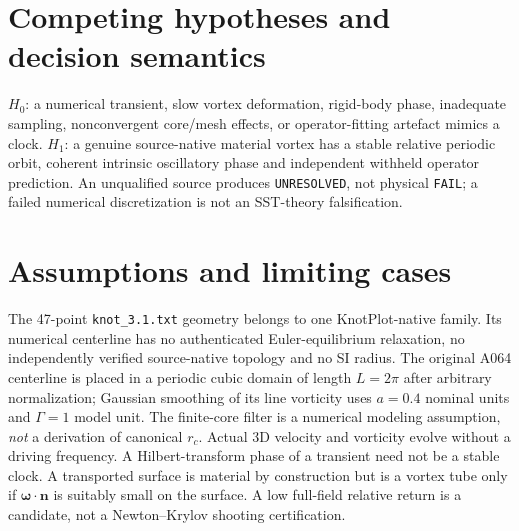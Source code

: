 \documentclass[11pt,a4paper]{article}
\begin{document}
\section{Competing hypotheses and decision semantics}
$H_0$: a numerical transient, slow vortex deformation, rigid-body phase, inadequate sampling, nonconvergent core/mesh effects, or operator-fitting artefact mimics a clock. $H_1$: a genuine source-native material vortex has a stable relative periodic orbit, coherent intrinsic oscillatory phase and independent withheld operator prediction. An unqualified source produces \texttt{UNRESOLVED}, not physical \texttt{FAIL}; a failed numerical discretization is not an SST-theory falsification.

\section{Assumptions and limiting cases}
The 47-point \texttt{knot\_3.1.txt} geometry belongs to one KnotPlot-native family. Its numerical centerline has no authenticated Euler-equilibrium relaxation, no independently verified source-native topology and no SI radius. The original A064 centerline is placed in a periodic cubic domain of length $L=2\pi$ after arbitrary normalization; Gaussian smoothing of its line vorticity uses $a=0.4$ nominal units and $\Gamma=1$ model unit. The finite-core filter is a numerical modeling assumption, \emph{not} a derivation of canonical $r_c$. Actual 3D velocity and vorticity evolve without a driving frequency. A Hilbert-transform phase of a transient need not be a stable clock. A transported surface is material by construction but is a vortex tube only if $\bm\omega\cdot\mathbf n$ is suitably small on the surface. A low full-field relative return is a candidate, not a Newton--Krylov shooting certification.

\end{document}
